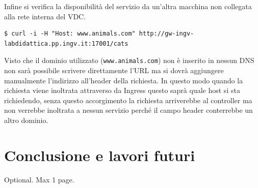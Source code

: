 \documentclass[12pt,a4paper,openright,twoside]{book}
\begin{document}
Infine si verifica la disponibilità del servizio da un'altra macchina non collegata alla rete interna del VDC. 
\begin{lstlisting}
$ curl -i -H "Host: www.animals.com" http://gw-ingv-labdidattica.pp.ingv.it:17001/cats
\end{lstlisting}
Visto che il dominio utilizzato (\texttt{www.animals.com}) non è inserito in nessun DNS non sarà possibile scrivere direttamente l'URL ma si dovrà aggiungere manualmente
l'indirizzo all'header della richiesta. In questo modo quando la richiesta viene inoltrata attraverso da Ingress questo saprà quale host si sta richiedendo,
senza questo accorgimento la richiesta arriverebbe al controller ma non verrebbe inoltrata a nessun servizio perché il campo header conterrebbe un altro dominio. 

\chapter{Conclusione e lavori futuri}
%
%


\backmatter

\nocite{*} %




\begin{acknowledgements} %
Optional. Max 1 page.
\end{acknowledgements}
\end{document}

